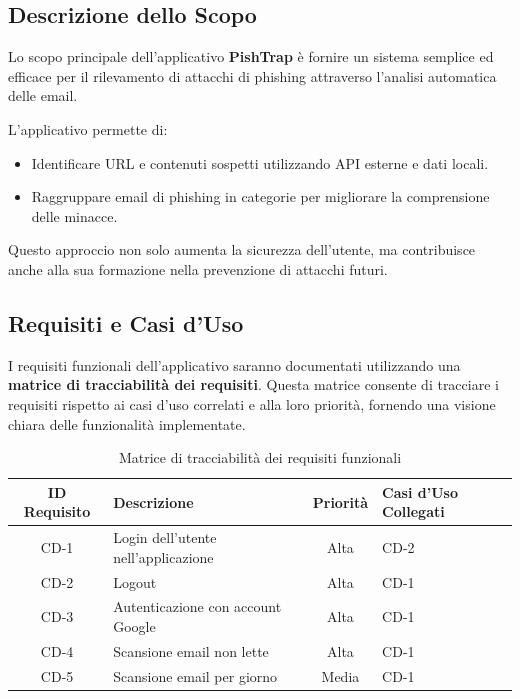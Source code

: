 \subsection{Descrizione dello Scopo}
Lo scopo principale dell'applicativo \textbf{PishTrap} è fornire un sistema semplice ed efficace per il rilevamento di attacchi di phishing attraverso l'analisi automatica delle email. 

L'applicativo permette di:

\begin{itemize}
    \item Identificare URL e contenuti sospetti utilizzando API esterne e dati locali.
    \item Raggruppare email di phishing in categorie per migliorare la comprensione delle minacce.
\end{itemize}

Questo approccio non solo aumenta la sicurezza dell'utente, ma contribuisce anche alla sua formazione nella prevenzione di attacchi futuri.

\subsection{Requisiti e Casi d'Uso}
I requisiti funzionali dell'applicativo saranno documentati utilizzando una \textbf{matrice di tracciabilità dei requisiti}. Questa matrice consente di tracciare i requisiti rispetto ai casi d'uso correlati e alla loro priorità, fornendo una visione chiara delle funzionalità implementate.

\begin{table}[h!]
\centering
\begin{tabular}{|c|l|c|l|}
\hline
\textbf{ID Requisito} & \textbf{Descrizione}           & \textbf{Priorità} & \textbf{Casi d'Uso Collegati} \\ \hline
CD-1                 & Login dell'utente nell'applicazione    & Alta              & CD-2                \\ \hline
CD-2                 & Logout    & Alta             & CD-1                 \\ \hline
CD-3                 & Autenticazione con account Google    & Alta            & CD-1   \\ \hline
CD-4                 & Scansione email non lette    & Alta             & CD-1                 \\ \hline
CD-5                 & Scansione email per giorno    & Media             & CD-1                 \\ \hline
\end{tabular}
\caption{Matrice di tracciabilità dei requisiti funzionali}
\label{tab:tracciabilita-requisiti}
\end{table}

